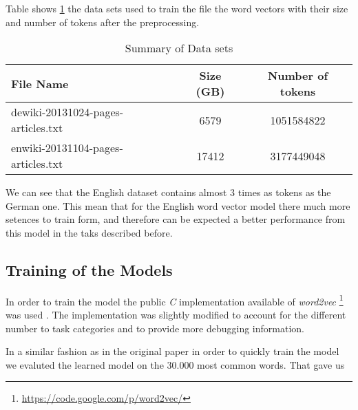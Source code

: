 Table shows \ref{tab:summ_dataset_germanword2vec} the data sets used
to train the file the word vectors with their size and number of tokens after
the preprocessing. 
  

 \begin{table}[h]
   \centering
   \caption{Summary of Data sets} 
   \label{tab:summ_dataset_germanword2vec}

   \begin{tabular}{ |l|c|c| }
   \hline           
    File Name &  Size (GB) & Number of tokens \\  \hline           
    dewiki-20131024-pages-articles.txt & 6579 &   1051584822 \\
    enwiki-20131104-pages-articles.txt & 17412 &  3177449048  \\
    \hline

\end{tabular}
\end{table}



We can see that the English dataset contains almost 3 times as tokens as the
German one. This mean that for the English word vector model  there much more
setences to train form, and therefore can be expected a better performance
from this model in the taks described before. 
  
\subsection{Training of the Models}
\label{experiments:sub:Training}

In order to train the model the public \emph{C} implementation available of
\textit{word2vec} \footnote{\url{https://code.google.com/p/word2vec/}} was
used . The implementation was slightly modified to account for the different
number to task categories and to provide more debugging information. 

In a similar fashion as in the original paper in order to quickly train the
model we evaluted the learned model on the 30.000 most common words. That
gave us 









